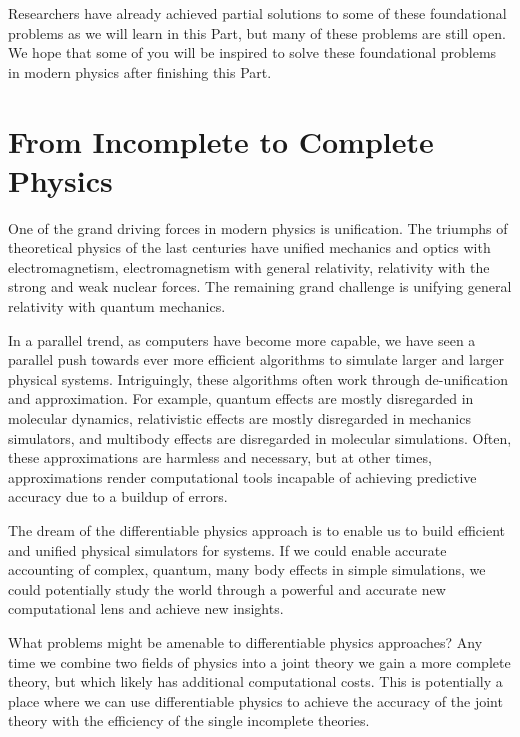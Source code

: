 \documentclass[book.tex]{subfiles}
\begin{document}

Researchers have already achieved partial solutions to some of these foundational problems as we will learn in this Part, but many of these problems are still open. We hope that some of you will be inspired to solve these foundational problems in modern physics after finishing this Part.

\section{From Incomplete to Complete Physics}

One of the grand driving forces in modern physics is unification. The triumphs of theoretical physics of the last centuries have unified mechanics and optics with electromagnetism, electromagnetism with general relativity, relativity with the strong and weak nuclear forces. The remaining grand challenge is unifying general relativity with quantum mechanics.

In a parallel trend, as computers have become more capable, we have seen a parallel push towards ever more efficient algorithms to simulate larger and larger physical systems. Intriguingly, these algorithms often work through de-unification and approximation. For example, quantum effects are mostly disregarded in molecular dynamics, relativistic effects are mostly disregarded in mechanics simulators, and multibody effects are disregarded in molecular simulations. Often, these approximations are harmless and necessary, but at other times, approximations render computational tools incapable of achieving predictive accuracy due to a buildup of errors.

The dream of the differentiable physics approach is to enable us to build efficient and unified physical simulators for systems. If we could enable accurate accounting of complex, quantum, many body effects in simple simulations, we could potentially study the world through a powerful and accurate new computational lens and achieve new insights.

What problems might be amenable to differentiable physics approaches? Any time we combine two fields of physics into a joint theory we gain a more complete theory, but which likely has additional computational costs. This is potentially a place where we can use differentiable physics to achieve the accuracy of the joint theory with the efficiency of the single incomplete theories.
\end{document}

